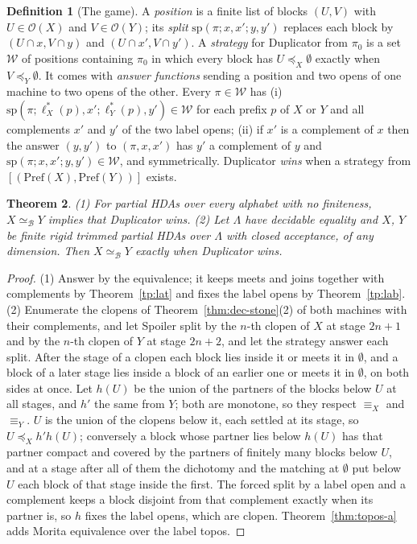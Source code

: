 \documentclass{lmcs}
\newtheorem{theorem}{Theorem}[section]
\theoremstyle{definition}
\newtheorem{definition}[theorem]{Definition}
\theoremstyle{remark}
\newcommand{\Op}{\mathcal{O}}
\newcommand{\Pref}{\mathrm{Pref}}
\newcommand{\fle}[1]{\preceq_{#1}}
\newcommand{\feq}[1]{\equiv_{#1}}
\providecommand{\splitP}{\mathrm{sp}}
\providecommand{\eqB}{\simeq_{\mathcal{B}}}
\providecommand{\lst}[1]{\ell^{*}_{#1}}
\begin{document}
\begin{definition}[The game]\label{def:game}\label{def:game-strategy}
A \emph{position} is a finite list of blocks $(U,V)$ with $U\in\Op(X)$ and $V\in\Op(Y)$; its \emph{split}
$\splitP(\pi;x,x';y,y')$ replaces each block by $(U\cap x,V\cap y)$ and $(U\cap x',V\cap y')$. A
\emph{strategy} for Duplicator from $\pi_0$ is a set $\mathcal W$ of positions containing $\pi_0$ in which every block has
$U\fle{X}\emptyset$ exactly when $V\fle{Y}\emptyset$. It comes with \emph{answer functions} sending a position and two
opens of one machine to two opens of the other. Every $\pi\in \mathcal W$ has (i)
$\splitP(\pi;\lst{X}(p),x';\lst{Y}(p),y')\in \mathcal W$ for each prefix $p$ of $X$ or $Y$ and all complements $x'$ and $y'$ of the two
label opens; (ii) if $x'$ is a complement of $x$ then the answer $(y,y')$ to $(\pi,x,x')$ has $y'$ a complement of $y$ and
$\splitP(\pi;x,x';y,y')\in \mathcal W$, and symmetrically. Duplicator \emph{wins} when a strategy from $[(\Pref(X),\Pref(Y))]$ exists.
\end{definition}

\begin{theorem}\label{thm:game}
(1) For partial HDAs over every alphabet with no finiteness, $X\eqB Y$ implies that Duplicator
wins. (2) Let $\Lambda$ have decidable equality and $X$, $Y$ be finite rigid trimmed
partial HDAs over $\Lambda$ with closed acceptance, of any dimension. Then $X\eqB Y$ exactly when Duplicator
wins.
\end{theorem}

\begin{proof}
(1) Answer by the equivalence; it keeps meets and joins together with complements by Theorem~\ref{tp:lat} and fixes the
label opens by Theorem~\ref{tp:lab}. (2) Enumerate
the clopens of Theorem~\ref{thm:dec-stone}(2) of both machines with their complements, and let Spoiler split by the
$n$-th clopen of $X$ at stage $2n+1$ and by the $n$-th clopen of $Y$ at stage $2n+2$, and let the strategy answer each
split. After the stage of a clopen each block lies inside it or meets it
in $\emptyset$, and a block of a later stage lies inside a block of an earlier one or meets it in $\emptyset$, on both
sides at once. Let $h(U)$ be the union of the partners of the blocks below $U$ at all
stages, and $h'$ the same from $Y$; both are monotone, so they respect $\feq{X}$ and
$\feq{Y}$. $U$ is the union of the clopens below it, each settled at its
stage, so $U\fle{X}h'h(U)$; conversely a block whose partner lies below $h(U)$ has that partner compact and covered
by the partners of finitely many blocks below $U$, and at a stage after all of them the dichotomy and the matching at
$\emptyset$ put below $U$ each block of that stage inside the first. The forced split by a label open and a
complement keeps a block disjoint from that complement exactly when its partner is, so $h$ fixes the label opens, which are
clopen. Theorem~\ref{thm:topos-a} adds Morita equivalence over the label topos.
\end{proof}
\end{document}

